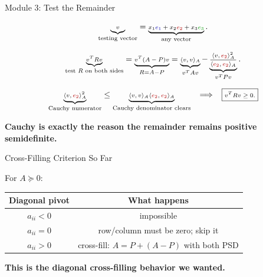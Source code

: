 \documentclass[10pt]{beamer}
\theoremstyle{definition}
\newcommand{\x}[1]{\alert{\textbf{#1}}}
\newcommand{\rd}[1]{{\color{red!70!black}#1}}
\newcommand{\bl}[1]{{\color{blue!70!black}#1}}
\newcommand{\gn}[1]{{\color{green!60!black}#1}}
\begin{document}
\begin{frame}[shrink=8]{Module 3: Test the Remainder}

\[
\scriptsize
\underbrace{v}_{\text{testing vector}}
=
\underbrace{x_1\bl{e_1}+x_2\rd{e_2}+x_3\gn{e_3}}_{\text{any vector}}.
\]

\vfill

\[
\scriptsize
\underbrace{v^TRv}_{\text{test }R\text{ on both sides}}
=
\underbrace{v^T(A-P)v}_{R=A-P}
=
\underbrace{\langle v,v\rangle_A}_{v^TAv}
-
\underbrace{\frac{\langle v,\rd{e_2}\rangle_A^2}{\langle \rd{e_2},\rd{e_2}\rangle_A}}_{v^TPv}.
\]

\vfill

\[
\scriptsize
\underbrace{\langle v,\rd{e_2}\rangle_A^2}_{\text{Cauchy numerator}}
\le
\underbrace{\langle v,v\rangle_A\langle \rd{e_2},\rd{e_2}\rangle_A}_{\text{Cauchy denominator clears}}
\quad\Longrightarrow\quad
\boxed{v^TRv\ge0.}
\]

\vfill

\begin{center}
\x{Cauchy is exactly the reason the remainder remains positive semidefinite.}
\end{center}

\end{frame}


\begin{frame}{Cross-Filling Criterion So Far}

For $A\succeq0$:

\vfill

\begin{center}
\renewcommand{\arraystretch}{1.35}
\begin{tabular}{c|c}
\textbf{Diagonal pivot} & \textbf{What happens}\\
\hline
$a_{ii}<0$ & impossible\\
$a_{ii}=0$ & row/column must be zero; skip it\\
$a_{ii}>0$ & cross-fill: $A=P+(A-P)$ with both PSD
\end{tabular}
\end{center}

\vfill

\begin{center}
\x{This is the diagonal cross-filling behavior we wanted.}
\end{center}

\end{frame}
\end{document}
